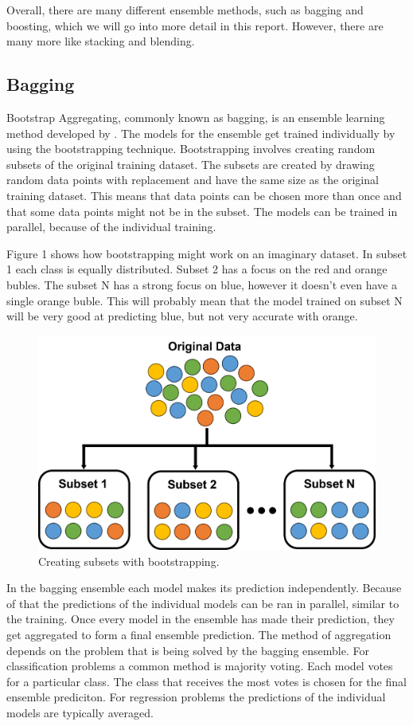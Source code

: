 Overall, there are many different ensemble methods, such as bagging and boosting, 
which we will go into more detail in this report. However, there are many more 
like stacking and blending.

\subsection{Bagging}

Bootstrap Aggregating, commonly known as bagging, is an ensemble learning method
developed by \citet*{Breiman1996}. The models for the ensemble get trained individually
by using the bootstrapping technique. Bootstrapping involves creating random
subsets of the original training dataset. The subsets are created by drawing 
random data points with replacement and have the same size as the original
training dataset. This means that data points can be chosen more than once and
that some data points might not be in the subset. The models can be trained in
parallel, because of the individual training.


Figure 1 shows how bootstrapping might work on an imaginary dataset. In subset 1
each class is equally distributed. Subset 2 has a focus on the red and orange bubles.
The subset N has a strong focus on blue, however it doesn't even have a single 
orange buble. This will probably mean that the model trained on subset N will be very
good at predicting blue, but not very accurate with orange.

\begin{figure}[htbp]
    \centering
    \includegraphics[width=.5\textwidth]{figures/bootstrapping}
    \caption{Creating subsets with bootstrapping.}
\end{figure}

In the bagging ensemble each model makes its prediction independently. Because of
that the predictions of the individual models can be ran in parallel, similar to
the training. Once every model in the ensemble has made their prediction, they get
aggregated to form a final ensemble prediction. The method of aggregation depends
on the problem that is being solved by the bagging ensemble. 
For classification problems a common method is majority voting. Each model votes 
for a particular class. The class that receives the most votes is chosen for the
final ensemble prediciton.
For regression problems the predictions of the individual models are typically 
averaged.

